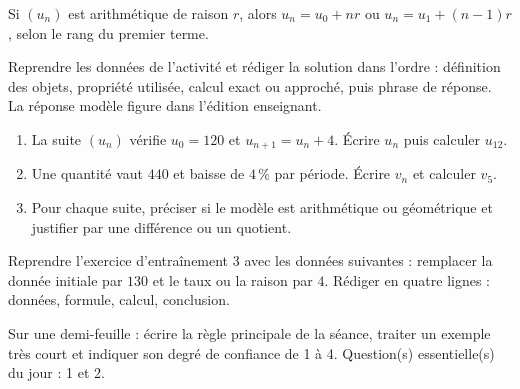 \begin{traceecrite}Si $(u_n)$ est arithmétique de raison $r$, alors $u_n=u_0+nr$ ou $u_n=u_1+(n-1)r$, selon le rang du premier terme.\end{traceecrite}

\begin{exemple}
Reprendre les données de l'activité et rédiger la solution dans l'ordre : définition des objets, propriété utilisée, calcul exact ou approché, puis phrase de réponse. La réponse modèle figure dans l'édition enseignant.
\end{exemple}

\begin{exercice}[-- essentiel]
\begin{enumerate}\item La suite $(u_n)$ vérifie $u_0=120$ et $u_{n+1}=u_n+4$. Écrire $u_n$ puis calculer $u_{12}$.\item Une quantité vaut $440$ et baisse de $4\,\%$ par période. Écrire $v_n$ et calculer $v_5$.\item Pour chaque suite, préciser si le modèle est arithmétique ou géométrique et justifier par une différence ou un quotient.\end{enumerate}
\end{exercice}


\begin{dm}Reprendre l'exercice d'entraînement 3 avec les données suivantes : remplacer la donnée initiale par $130$ et le taux ou la raison par $4$. Rédiger en quatre lignes : données, formule, calcul, conclusion.\end{dm}

\begin{sortie}Sur une demi-feuille : écrire la règle principale de la séance, traiter un exemple très court et indiquer son degré de confiance de 1 à 4. Question(s) essentielle(s) du jour : 1 et 2.\end{sortie}

